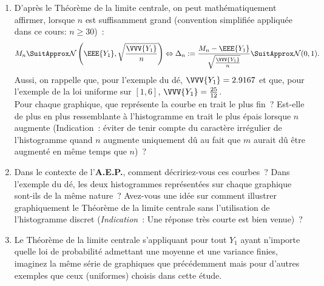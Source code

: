 \documentclass[10pt]{report}
\begin{document}
\begin{exercice}
\begin{enumerate}
\item D'après le Théorème de la limite centrale, on peut mathématiquement affirmer, lorsque $n$ est suffisamment grand (convention simplifiée appliquée dans ce cours: $n\geq 30$)~:
\[
  M_n\SuitApprox \mathcal{N}\left(\EEE{Y_1},\sqrt{\frac{\VVV{Y_1}}{n}}\right) \Leftrightarrow \Delta_n:=\frac{M_n-\EEE{Y_1}}{\sqrt{\frac{\VVV{Y_1}}{n}}} \SuitApprox \mathcal{N}(0,1).
\]
Aussi, on rappelle que, pour l'exemple du dé, $\VVV{Y_1}=2.9167$ et que, pour l'exemple de la loi uniforme sur $[1,6]$,  $\VVV{Y_1}=\frac{25}{12}$.\\
Pour chaque graphique, que représente la courbe en trait le plus fin~?  Est-elle de plus en plus ressemblante à l'histogramme en trait le plus épais lorsque $n$ augmente (Indication~: éviter de tenir compte du caractère irrégulier de l'histogramme quand $n$ augmente uniquement dû au fait que $m$ aurait dû être augmenté en même temps que $n$)~?
\item Dans le contexte de l'\textbf{A.E.P.}, comment décririez-vous ces courbes~? %
Dans l'exemple du dé, les deux histogrammes représentées sur chaque graphique sont-ils de la même nature~? Avez-vous une idée sur comment illustrer graphiquement le Théorème de la limite centrale sans l'utilisation de l'histogramme discret (\textit{Indication}~: Une réponse très courte est bien venue)~?  
\item Le Théorème de la limite centrale s'appliquant pour tout $Y_1$ ayant n'importe quelle loi de probabilité admettant une moyenne et une variance finies, imaginez la même série de graphiques que précédemment mais pour d'autres exemples que ceux (uniformes) choisis dans cette étude.   
\end{enumerate}

\end{exercice}
\end{document}
